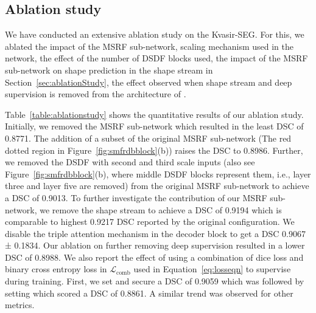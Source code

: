 \documentclass[journal,twoside,web]{IEEEtran}
\newcommand{\loss}{\ensuremath{\mathcal{L}}}
\newcommand{\lcomb}{\ensuremath{\loss_\text{comb}}\xspace}
\newcommand{\sysname}{\text{MSRF-Net}\xspace}
\begin{document}
\subsection{Ablation study}{\label{sec:ablationStudy}}
We have conducted an extensive ablation study on the Kvasir-SEG. For this, we ablated the impact of the MSRF sub-network, scaling mechanism used in the network,  the effect of the number of DSDF blocks used, the impact of the MSRF sub-network on shape prediction in the shape stream in Section~\ref{sec:ablationStudy}, the effect observed when shape stream and deep supervision is removed from the architecture of \sysname.

Table~\ref{table:ablationstudy} shows the quantitative results of our ablation study. Initially, we removed the MSRF sub-network which resulted in the least \ac{DSC} of 0.8771. The addition of a subset of the original MSRF sub-network (The red dotted region in Figure~\ref{fig:smfrdbblock}(b)) raises the \ac{DSC} to 0.8986. Further, we removed the \ac{DSDF} with second and third scale inputs (also see Figure~\ref{fig:smfrdbblock}(b), where middle \ac{DSDF} blocks represent them, i.e., layer three and layer five are removed) from the original MSRF sub-network to achieve a \ac{DSC} of 0.9013. To further investigate the contribution of our MSRF sub-network, we remove the shape stream to achieve a \ac{DSC} of 0.9194 which is comparable to highest 0.9217 \ac{DSC} reported by the original \sysname configuration. We disable the triple attention mechanism in the decoder block to get a \ac{DSC} 0.9067 ± 0.1834. Our ablation on further removing deep supervision resulted in a lower \ac{DSC} of 0.8988.
We also report the effect of using a combination of dice loss and binary cross entropy loss in \lcomb used in Equation~\ref{eq:losseqn} to supervise \sysname during training. First, we set   and secure a \ac{DSC} of 0.9059 which was followed by setting  which scored a \ac{DSC} of 0.8861. A similar trend was observed for other metrics.
\end{document}
